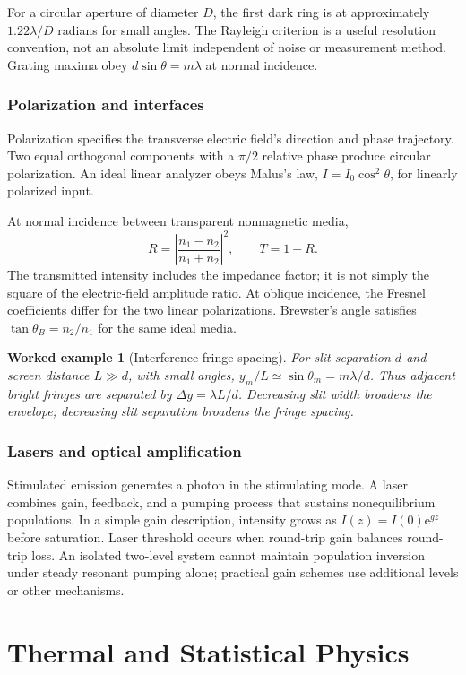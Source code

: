 \documentclass[11pt,oneside]{book}
\newcommand{\ee}{\mathrm{e}}
\theoremstyle{reviewstyle}
\newtheorem{example}{Worked example}[chapter]
\begin{document}
For a circular aperture of diameter $D$, the first dark ring is at approximately $1.22\lambda/D$ radians for small angles. The Rayleigh criterion is a useful resolution convention, not an absolute limit independent of noise or measurement method. Grating maxima obey $d\sin\theta=m\lambda$ at normal incidence.
\section{Polarization and interfaces}
Polarization specifies the transverse electric field's direction and phase trajectory. Two equal orthogonal components with a $\pi/2$ relative phase produce circular polarization. An ideal linear analyzer obeys Malus's law, $I=I_0\cos^2\theta$, for linearly polarized input.

At normal incidence between transparent nonmagnetic media,
\begin{equation}R=\left|\frac{n_1-n_2}{n_1+n_2}\right|^2,\qquad T=1-R.\end{equation}
The transmitted intensity includes the impedance factor; it is not simply the square of the electric-field amplitude ratio. At oblique incidence, the Fresnel coefficients differ for the two linear polarizations. Brewster's angle satisfies $\tan\theta_B=n_2/n_1$ for the same ideal media.
\begin{example}[Interference fringe spacing]
For slit separation $d$ and screen distance $L\gg d$, with small angles, $y_m/L\simeq\sin\theta_m=m\lambda/d$. Thus adjacent bright fringes are separated by $\Delta y=\lambda L/d$. Decreasing slit width broadens the envelope; decreasing slit separation broadens the fringe spacing.
\end{example}
\section{Lasers and optical amplification}
Stimulated emission generates a photon in the stimulating mode. A laser combines gain, feedback, and a pumping process that sustains nonequilibrium populations. In a simple gain description, intensity grows as $I(z)=I(0)\ee^{gz}$ before saturation. Laser threshold occurs when round-trip gain balances round-trip loss. An isolated two-level system cannot maintain population inversion under steady resonant pumping alone; practical gain schemes use additional levels or other mechanisms.

\part{Thermal and Statistical Physics}
\end{document}
